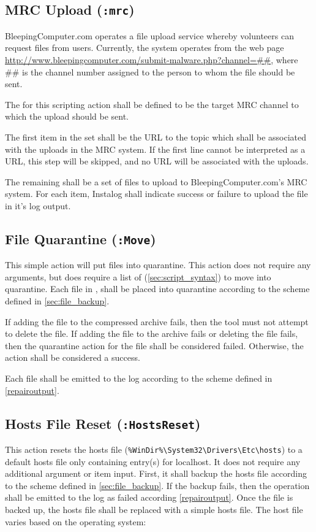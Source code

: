 \subsection{MRC Upload (\texttt{:mrc})}
BleepingComputer.com operates a file upload service whereby volunteers can
request files from users. Currently, the system operates from the web page
\url{http://www.bleepingcomputer.com/submit-malware.php?channel=##}, where \#\#
is the channel number assigned to the person to whom the file should be sent.

The  for this scripting action shall be defined to be the target MRC
channel to which the upload should be sent.

The first item in the set  shall be the URL to the topic which shall
be associated with the uploads in the MRC system. If the first line cannot be
interpreted as a URL, this step will be skipped, and no URL will be associated
with the uploads.

The remaining  shall be a set of files to upload to
BleepingComputer.com's MRC system. For each item, Instalog shall indicate
success or failure to upload the file in it's log output.

\subsection{File Quarantine (\texttt{:Move})} \label{quarantine}
This simple action will put files into quarantine.  This action does not require
any arguments, but does require a list of  (\ref{sec:script_syntax})
to move into quarantine.  Each file in , shall be placed into
quarantine according to the scheme defined in \ref{sec:file_backup}.

If adding the file to the compressed archive fails, then the tool must not
attempt to delete the file.  If adding the file to the archive fails or deleting
the file fails, then the quarantine action for the file shall be considered
failed.  Otherwise, the action shall be considered a success.  

Each file shall be emitted to the log according to the scheme defined in
\ref{repairoutput}.

\subsection{Hosts File Reset (\texttt{:HostsReset})}
This action resets the hosts file (\verb|%WinDir%\System32\Drivers\Etc\hosts|)
to a default hosts file only containing entry(s) for localhost.  It does not
require any additional argument or item input. First, it shall backup the hosts
file according to the scheme defined in \ref{sec:file_backup}.  If the backup
fails, then the operation shall be emitted to the log as failed according
\ref{repairoutput}. Once the file is backed up, the hosts file shall be replaced
with a simple hosts file.  The host file varies based on the operating system:

